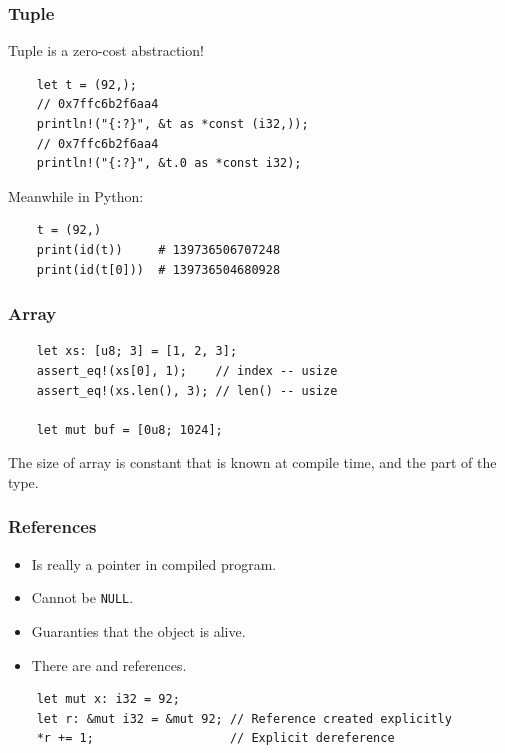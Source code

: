 \documentclass[aspectratio=1610,t]{beamer}
\begin{document}

\begin{frame}[fragile]
\frametitle{Tuple}
Tuple is a zero-cost abstraction!

\begin{verbatim}
    let t = (92,);
    // 0x7ffc6b2f6aa4
    println!("{:?}", &t as *const (i32,));
    // 0x7ffc6b2f6aa4
    println!("{:?}", &t.0 as *const i32);
\end{verbatim}

Meanwhile in Python:

\begin{verbatim}
    t = (92,)
    print(id(t))     # 139736506707248
    print(id(t[0]))  # 139736504680928
\end{verbatim}
\end{frame}


\begin{frame}[fragile]
\frametitle{Array}
\begin{verbatim}
    let xs: [u8; 3] = [1, 2, 3];
    assert_eq!(xs[0], 1);    // index -- usize
    assert_eq!(xs.len(), 3); // len() -- usize

    let mut buf = [0u8; 1024];
\end{verbatim}

The size of array is constant that is known at compile time, and the part of the type.
\end{frame}


\begin{frame}[fragile]
\frametitle{References}
\begin{itemize}
    \item Is really a pointer in compiled program.
    \item Cannot be \texttt{NULL}.
    \item Guaranties that the object is alive.
    \item There are \textt{\&} and  references.
\end{itemize}

\begin{verbatim}
    let mut x: i32 = 92;
    let r: &mut i32 = &mut 92; // Reference created explicitly
    *r += 1;                   // Explicit dereference
\end{verbatim}
\end{frame}
\end{document}
